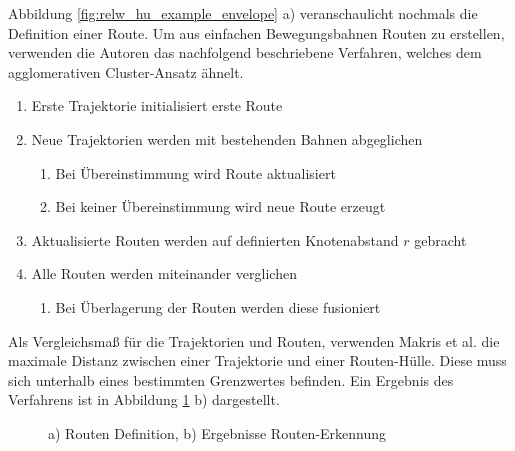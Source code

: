Abbildung \ref{fig:relw_hu_example_envelope} a) veranschaulicht nochmals die Definition einer Route.
Um aus einfachen Bewegungsbahnen Routen zu erstellen, verwenden die Autoren das nachfolgend beschriebene Verfahren,
welches dem agglomerativen Cluster-Ansatz ähnelt.

\begin{enumerate}
    \item Erste Trajektorie initialisiert erste Route
    \item Neue Trajektorien werden mit bestehenden Bahnen abgeglichen
    \begin{enumerate}
        \item Bei Übereinstimmung wird Route aktualisiert
        \item Bei keiner Übereinstimmung wird neue Route erzeugt
    \end{enumerate}
    \item Aktualisierte Routen werden auf definierten Knotenabstand $r$ gebracht
    \item Alle Routen werden miteinander verglichen
    \begin{enumerate}
        \item Bei Überlagerung der Routen werden diese fusioniert
    \end{enumerate}
\end{enumerate}

Als Vergleichsmaß für die Trajektorien und Routen, verwenden Makris et al. die maximale Distanz zwischen einer Trajektorie und
einer Routen-Hülle. Diese muss sich unterhalb eines bestimmten Grenzwertes befinden.
Ein Ergebnis des Verfahrens ist in Abbildung \ref{fig:relw_results_makris} b) dargestellt.

\begin{figure}[H]
    \centering
    \caption[Routen-Definition und Ergebnisse Routen-Erkennung (Makris et al.)]{a) Routen Definition, b) Ergebnisse Routen-Erkennung \cite[]{Makris2005}}
    \label{fig:relw_results_makris}
\end{figure}


